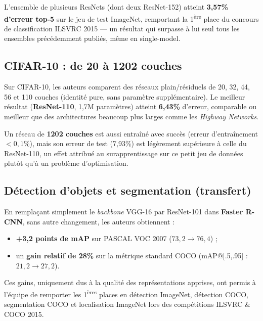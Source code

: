 \documentclass[a4paper,11pt]{article}
\begin{document}
L'ensemble de plusieurs ResNets (dont deux ResNet-152) atteint \textbf{3,57\% d'erreur top-5} sur le jeu de test ImageNet, remportant la 1\textsuperscript{ère} place du concours de classification ILSVRC 2015 --- un résultat qui surpasse à lui seul tous les ensembles précédemment publiés, même en single-model.

\subsection{CIFAR-10 : de 20 à 1202 couches}
Sur CIFAR-10, les auteurs comparent des réseaux plain/résiduels de 20, 32, 44, 56 et 110 couches (identité pure, sans paramètre supplémentaire). Le meilleur résultat (\textbf{ResNet-110}, 1,7M paramètres) atteint \textbf{6,43\%} d'erreur, comparable ou meilleur que des architectures beaucoup plus larges comme les \emph{Highway Networks}.

Un réseau de \textbf{1202 couches} est aussi entraîné avec succès (erreur d'entraînement $< 0{,}1\%$), mais son erreur de test (7,93\%) est légèrement supérieure à celle du ResNet-110, un effet attribué au surapprentissage sur ce petit jeu de données plutôt qu'à un problème d'optimisation.

\subsection{Détection d'objets et segmentation (transfert)}
En remplaçant simplement le \emph{backbone} VGG-16 par ResNet-101 dans \textbf{Faster R-CNN}, sans autre changement, les auteurs obtiennent :
\begin{itemize}
    \item \textbf{+3,2 points de mAP} sur PASCAL VOC 2007 ($73{,}2 \rightarrow 76{,}4$) ;
    \item un \textbf{gain relatif de 28\%} sur la métrique standard COCO (mAP@[.5,.95] : $21{,}2 \rightarrow 27{,}2$).
\end{itemize}

Ces gains, uniquement dus à la qualité des représentations apprises, ont permis à l'équipe de remporter les 1\textsuperscript{ères} places en détection ImageNet, détection COCO, segmentation COCO et localisation ImageNet lors des compétitions ILSVRC \& COCO 2015.

\end{document}
